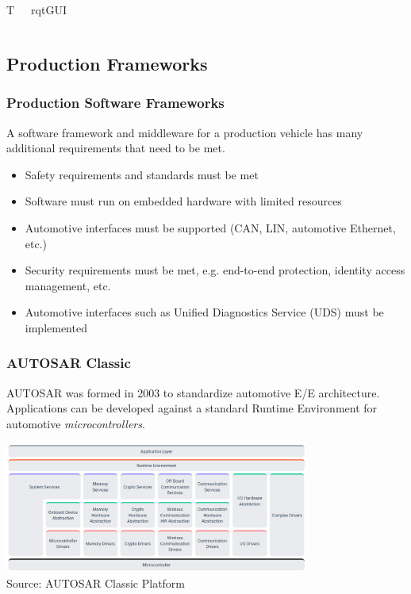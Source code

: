 \begin{frame}
\begin{columns}{T}
\begin{column}{0.35\textwidth}
        \scriptsize rqt\footnotemark[3] GUI
    \end{column}
\end{columns}
\end{frame}

\subsection{Production Frameworks}

\begin{frame}
\frametitle{Production Software Frameworks}
A software framework and middleware for a production vehicle has many
additional requirements that need to be met.

\begin{itemize}
    \item Safety requirements and standards must be met
    \item Software must run on embedded hardware with limited resources
    \item Automotive interfaces must be supported (CAN, LIN, automotive
        Ethernet, etc.)
    \item Security requirements must be met, e.g. end-to-end protection, 
        identity access management, etc.
    \item Automotive interfaces such as Unified Diagnostics Service (UDS) must
        be implemented
\end{itemize}
\end{frame}

\begin{frame}
\frametitle{AUTOSAR Classic}
AUTOSAR was formed in 2003 to standardize automotive E/E architecture.
Applications can be developed against a standard Runtime Environment
for automotive \emph{microcontrollers}.
\begin{center}
\includegraphics[width=0.75\textwidth]{images/autosar_classic.png}\\
\footnotesize  Source: AUTOSAR Classic Platform\footnotemark[1]
\end{center}
\end{frame}

